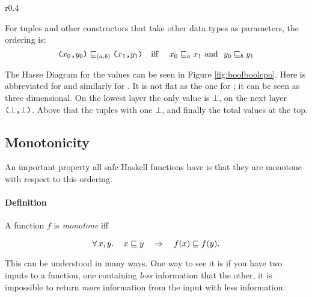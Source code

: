 \begin{wrapfigure}[25]{r}{0.4\textwidth} %
\begin{center}
\vspace{-30pt}

\caption{
    \texttt{(Bool,Bool)} order.
    \label{fig:boolboolcpo}
}
\end{center}
\end{wrapfigure} %
For tuples and other constructors that take other data types as
parameters, the ordering is:
\begin{equation*}
\texttt{(} x_0 \texttt{,} y_0 \texttt{)} \sqsubseteq_{(a,b)} \texttt{(} x_1 \texttt{,} y_1 \texttt{)} \text{\quad iff \quad}
x_0 \sqsubseteq_a x_1 \text{\,\,and \,\,} y_0 \sqsubseteq_b y_1
\end{equation*}

The Hasse Diagram for the  values can be seen in
Figure \ref{fig:boolboolcpo}. Here  is abbreviated for 
and similarly for . It is not flat as the one for ;
it can be seen as three dimensional. On the lowest layer the only
value is $\bot$, on the next layer $\texttt{(} \bot \texttt{,} \bot \texttt{)}$. Above that
the tuples with one $\bot$, and finally the total values at the
top.

\vspace{55pt}

\subsection{Monotonicity}
 An important property all safe Haskell functions have is that they are
monotone with respect to this ordering.

\paragraph{Definition} A function $f$ is \emph{monotone} iff

\begin{equation*}
\forall \, x , y . \, \quad x \sqsubseteq y \quad \Rightarrow \quad f(x) \sqsubseteq f(y).
\end{equation*}

This can be understood in many ways. One way to see it is if you have
two inputs to a function, one containing \emph{less} information that
the other, it is impossible to return \emph{more} information from the
input with less information.

